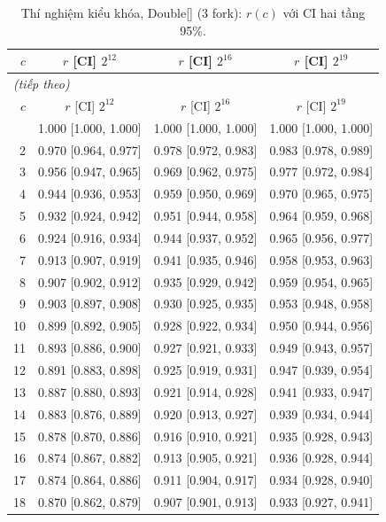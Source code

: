 \footnotesize
\begin{longtable}{rccc}
\caption{Thí nghiệm kiểu khóa, Double[] (3 fork): $r(c)$ với CI hai tầng 95\%.}\label{tab:d3_full_double}\\
\toprule
$c$ & $r$ [CI] $2^{12}$ & $r$ [CI] $2^{16}$ & $r$ [CI] $2^{19}$ \\
\midrule
\endfirsthead
\multicolumn{4}{l}{\textit{(tiếp theo)}}\\
\toprule
$c$ & $r$ [CI] $2^{12}$ & $r$ [CI] $2^{16}$ & $r$ [CI] $2^{19}$ \\
\midrule
\endhead
\bottomrule
\endlastfoot
1 & 1.000 [1.000, 1.000] & 1.000 [1.000, 1.000] & 1.000 [1.000, 1.000] \\
2 & 0.970 [0.964, 0.977] & 0.978 [0.972, 0.983] & 0.983 [0.978, 0.989] \\
3 & 0.956 [0.947, 0.965] & 0.969 [0.962, 0.975] & 0.977 [0.972, 0.984] \\
4 & 0.944 [0.936, 0.953] & 0.959 [0.950, 0.969] & 0.970 [0.965, 0.975] \\
5 & 0.932 [0.924, 0.942] & 0.951 [0.944, 0.958] & 0.964 [0.959, 0.968] \\
6 & 0.924 [0.916, 0.934] & 0.944 [0.937, 0.952] & 0.965 [0.956, 0.977] \\
7 & 0.913 [0.907, 0.919] & 0.941 [0.935, 0.946] & 0.958 [0.953, 0.963] \\
8 & 0.907 [0.902, 0.912] & 0.935 [0.929, 0.942] & 0.959 [0.954, 0.965] \\
9 & 0.903 [0.897, 0.908] & 0.930 [0.925, 0.935] & 0.953 [0.948, 0.958] \\
10 & 0.899 [0.892, 0.905] & 0.928 [0.922, 0.934] & 0.950 [0.944, 0.956] \\
11 & 0.893 [0.886, 0.900] & 0.927 [0.921, 0.933] & 0.949 [0.943, 0.957] \\
12 & 0.891 [0.883, 0.898] & 0.925 [0.919, 0.931] & 0.947 [0.939, 0.954] \\
13 & 0.887 [0.880, 0.893] & 0.921 [0.914, 0.928] & 0.941 [0.933, 0.947] \\
14 & 0.883 [0.876, 0.889] & 0.920 [0.913, 0.927] & 0.939 [0.934, 0.944] \\
15 & 0.878 [0.870, 0.886] & 0.916 [0.910, 0.921] & 0.935 [0.928, 0.943] \\
16 & 0.874 [0.867, 0.882] & 0.913 [0.905, 0.921] & 0.936 [0.928, 0.944] \\
17 & 0.874 [0.864, 0.886] & 0.911 [0.904, 0.917] & 0.934 [0.928, 0.940] \\
18 & 0.870 [0.862, 0.879] & 0.907 [0.901, 0.913] & 0.933 [0.927, 0.941] \\

\end{longtable}
